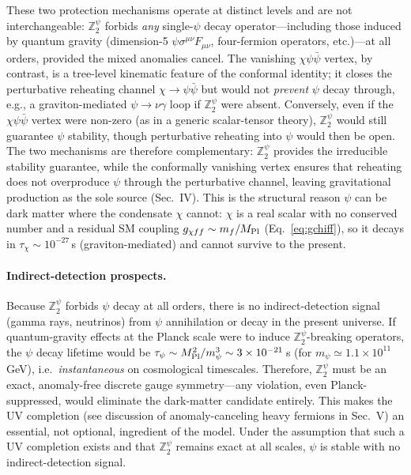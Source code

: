 \documentclass[pdflatex,sn-mathphys-num]{sn-jnl}
\newcommand{\MP}{M_{\rm Pl}}
\newcommand{\Ztwo}{\mathbb{Z}_2}
\newcommand{\Ztwopsi}{\Ztwo^{\psi}}
\theoremstyle{thmstyleone}
\begin{document}
These two protection mechanisms operate at distinct levels and are not interchangeable: $\Ztwopsi$ forbids \emph{any} single-$\psi$ decay operator---including those induced by quantum gravity (dimension-5 $\psi\sigma^{\mu\nu}F_{\mu\nu}$, four-fermion operators, etc.)---at all orders, provided the mixed anomalies cancel. The vanishing $\chi\psi\bar\psi$ vertex, by contrast, is a tree-level kinematic feature of the conformal identity; it closes the perturbative reheating channel $\chi\to\psi\bar\psi$ but would not \emph{prevent} $\psi$ decay through, e.g., a graviton-mediated $\psi\to\nu\gamma$ loop if $\Ztwopsi$ were absent. Conversely, even if the $\chi\psi\bar\psi$ vertex were non-zero (as in a generic scalar-tensor theory), $\Ztwopsi$ would still guarantee $\psi$ stability, though perturbative reheating into $\psi$ would then be open. The two mechanisms are therefore complementary: $\Ztwopsi$ provides the irreducible stability guarantee, while the conformally vanishing vertex ensures that reheating does not overproduce $\psi$ through the perturbative channel, leaving gravitational production as the sole source (Sec.~IV). This is the structural reason $\psi$ can be dark matter where the condensate $\chi$ cannot: $\chi$ is a real scalar with no conserved number and a residual SM coupling $g_{\chi ff}\sim m_f/\MP$ (Eq.~\eqref{eq:gchiff}), so it decays in $\tau_\chi\sim10^{-27}\,$s (graviton-mediated) and cannot survive to the present.

\paragraph{Indirect-detection prospects.} Because $\Ztwopsi$ forbids $\psi$ decay at all orders, there is no indirect-detection signal (gamma rays, neutrinos) from $\psi$ annihilation or decay in the present universe. If quantum-gravity effects at the Planck scale were to induce $\Ztwopsi$-breaking operators, the $\psi$ decay lifetime would be $\tau_\psi\sim\MP^2/m_\psi^3\sim3\times10^{-21}\,$s (for $m_\psi\simeq1.1\times10^{11}\,$GeV), i.e.\ \emph{instantaneous} on cosmological timescales. Therefore, $\Ztwopsi$ must be an exact, anomaly-free discrete gauge symmetry---any violation, even Planck-suppressed, would eliminate the dark-matter candidate entirely. This makes the UV completion (see discussion of anomaly-canceling heavy fermions in Sec.~V) an essential, not optional, ingredient of the model. Under the assumption that such a UV completion exists and that $\Ztwopsi$ remains exact at all scales, $\psi$ is stable with no indirect-detection signal.
\end{document}

